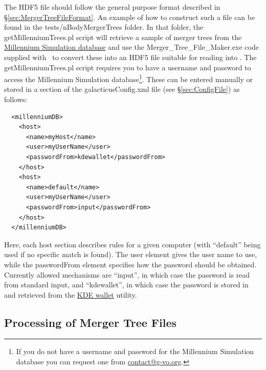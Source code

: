 The HDF5 file should follow the general purpose format described in \S\ref{sec:MergerTreeFileFormat}. An example of how to construct such a file can be found in the {\normalfont \ttfamily tests/nBodyMergerTrees} folder. In that folder, the {\normalfont \ttfamily getMillenniumTrees.pl} script will retrieve a sample of merger trees from the \href{http://www.g-vo.org/MyMillennium3/}{Millennium Simulation database} and use the {\normalfont \ttfamily Merger\_Tree\_File\_Maker.exe} code supplied with \glc\ to convert these into an HDF5 file suitable for reading into \glc. The {\normalfont \ttfamily getMillenniumTrees.pl} script requires you to have a username and password to access the Millennium Simulation database\footnote{If you do not have a username and password for the Millennium Simulation database you can request one from \href{mailto:contact@g-vo.org}{\normalfont \ttfamily contact@g-vo.org}.}. These can be entered manually or stored in a section of the {\normalfont \ttfamily galacticusConfig.xml} file (see \S\ref{sec:ConfigFile}) as follows:
\begin{verbatim}
  <millenniumDB>
    <host>
      <name>myHost</name>
      <user>myUserName</user>
      <passwordFrom>kdewallet</passwordFrom>
    </host>
    <host>
      <name>default</name>
      <user>myUserName</user>
      <passwordFrom>input</passwordFrom>
    </host>
  </millenniumDB>
\end{verbatim}
Here, each {\normalfont \ttfamily host} section describes rules for a given computer (with ``default'' being used if no specific match is found). The {\normalfont \ttfamily user} element gives the user name to use, while the {\normalfont \ttfamily passwordFrom} element specifies how the password should be obtained. Currently allowed mechanisms are ``input'', in which case the password is read from standard input, and ``kdewallet'', in which case the password is stored in and retrieved from the \href{http://utils.kde.org/projects/kwalletmanager/}{KDE wallet} utility.

\subsection{Processing of Merger Tree Files}\label{sec:MergerTreeFileProcessing}

